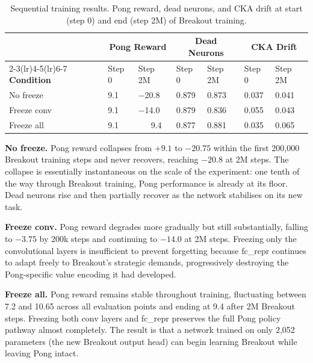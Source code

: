 \documentclass[a4paper]{article}
\begin{document}
\begin{table}[H]
\centering
\caption{Sequential training results. Pong reward, dead neurons, and CKA drift at start
(step 0) and end (step 2M) of Breakout training.}
\label{tab:sequential}
\begin{tabularx}{\linewidth}{lXXXXXX}
\toprule
 & \multicolumn{2}{c}{\textbf{Pong Reward}} & \multicolumn{2}{c}{\textbf{Dead Neurons}} & \multicolumn{2}{c}{\textbf{CKA Drift}} \\
\cmidrule(lr){2-3}\cmidrule(lr){4-5}\cmidrule(lr){6-7}
\textbf{Condition} & Step 0 & Step 2M & Step 0 & Step 2M & Step 0 & Step 2M \\
\midrule
No freeze     & 9.1 & $-$20.8 & 0.879 & 0.873 & 0.037 & 0.041 \\
Freeze conv   & 9.1 & $-$14.0 & 0.879 & 0.836 & 0.055 & 0.043 \\
Freeze all    & 9.1 & \ \ \ 9.4  & 0.877 & 0.881 & 0.035 & 0.065 \\
\bottomrule
\end{tabularx}
\end{table}

\textbf{No freeze.} Pong reward collapses from $+9.1$ to $-20.75$ within the first 200,000
Breakout training steps and never recovers, reaching $-20.8$ at 2M steps. The collapse is
essentially instantaneous on the scale of the experiment: one tenth of the way through
Breakout training, Pong performance is already at its floor. Dead neurons rise and then
partially recover as the network stabilises on its new task.

\textbf{Freeze conv.} Pong reward degrades more gradually but still substantially, falling
to $-3.75$ by 200k steps and continuing to $-14.0$ at 2M steps. Freezing only the
convolutional layers is insufficient to prevent forgetting because fc\_repr continues to
adapt freely to Breakout's strategic demands, progressively destroying the Pong-specific
value encoding it had developed.

\textbf{Freeze all.} Pong reward remains stable throughout training, fluctuating between
7.2 and 10.65 across all evaluation points and ending at 9.4 after 2M Breakout steps.
Freezing both conv layers and fc\_repr preserves the full Pong policy pathway almost
completely. The result is that a network trained on only 2,052 parameters (the new Breakout
output head) can begin learning Breakout while leaving Pong intact.
\end{document}
